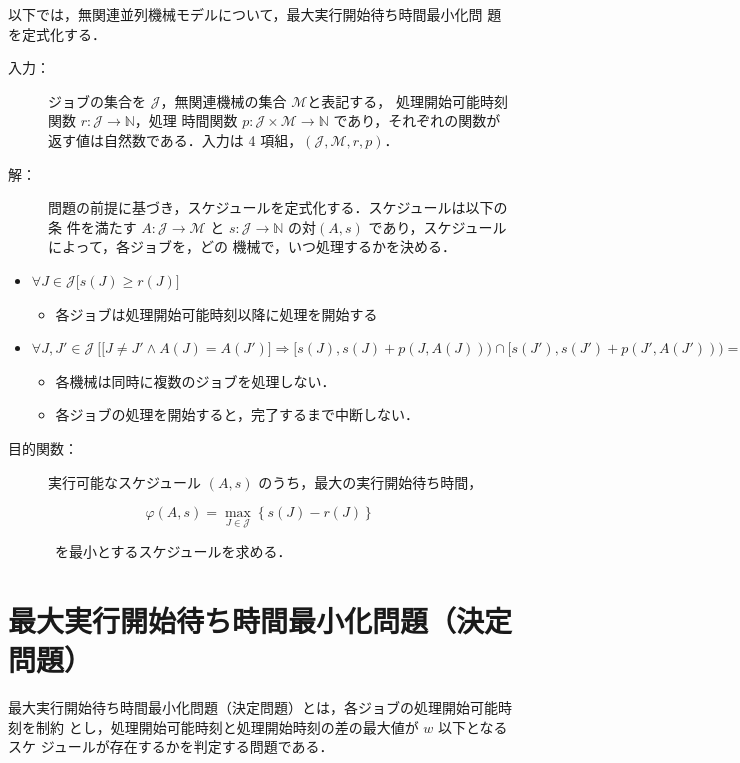 \documentclass[12pt]{optlab-bachelor}
\begin{document}
以下では，無関連並列機械モデルについて，最大実行開始待ち時間最小化問
題を定式化する．
\begin{description}
  \item[入力：] ジョブの集合を $\mathcal{J}$，無関連機械の集合 $\mathcal{M}$と表記する，
  処理開始可能時刻関数 $r : \mathcal{J} \to \mathbb{N}$，処理
  時間関数 $p : \mathcal{J} \times \mathcal{M} \to \mathbb{N}$
  であり，それぞれの関数が返す値は自然数である．入力は 4 項組，$(\mathcal{J}, \mathcal{M}, r, p)$．
  \item[解：] 問題の前提に基づき，スケジュールを定式化する．スケジュールは以下の条
  件を満たす $A : \mathcal{J} \to \mathcal{M}$ と $s : \mathcal{J} \to
  \mathbb{N}$ の対$(A,s)$ であり，スケジュールによって，各ジョブを，どの
  機械で，いつ処理するかを決める．
\end{description}

\begin{itemize}
  \item $\forall J \in \mathcal{J}\big[s(J) \ge r(J) \big]$
  \begin{itemize}
    \item 各ジョブは処理開始可能時刻以降に処理を開始する
  \end{itemize}

  \item {\footnotesize $\forall J, J' \in \mathcal{J}\ \Big[ \big[J\neq J' \land A(J) = A(J')\big] \Rightarrow [s(J), s(J)+p(J,A(J))) \cap[s(J'), s(J')+p(J', A(J'))) = \emptyset \Big]$}
  \begin{itemize}
    \item 各機械は同時に複数のジョブを処理しない．
    \item 各ジョブの処理を開始すると，完了するまで中断しない．
  \end{itemize}
\end{itemize}

\begin{description}
  \item[目的関数：] 実行可能なスケジュール $(A,s)$ のうち，最大の実行開始待ち時間，
\end{description}
$$\varphi(A,s) = {\displaystyle \max_{J \in \mathcal{J}} \left\{s(J) -
r(J)\right\}}$$
\begin{description}
  \item[] ~を最小とするスケジュールを求める．
\end{description}

\section{最大実行開始待ち時間最小化問題（決定問題）}
最大実行開始待ち時間最小化問題（決定問題）とは，各ジョブの処理開始可能時刻を制約
とし，処理開始可能時刻と処理開始時刻の差の最大値が $w$ 以下となるスケ
ジュールが存在するかを判定する問題である．
\end{document}
